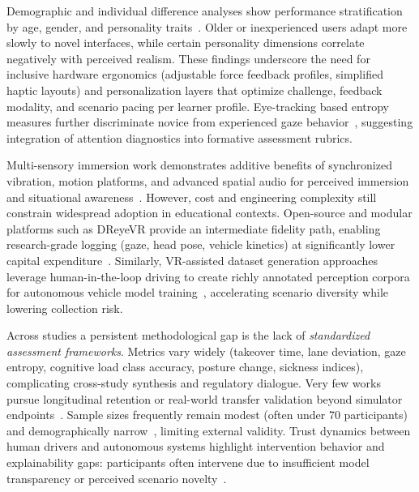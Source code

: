 Demographic and individual difference analyses show performance stratification by age, gender, and personality traits~\cite{Chang2020,Ju2024}. Older or inexperienced users adapt more slowly to novel interfaces, while certain personality dimensions correlate negatively with perceived realism. These findings underscore the need for inclusive hardware ergonomics (adjustable force feedback profiles, simplified haptic layouts) and personalization layers that optimize challenge, feedback modality, and scenario pacing per learner profile. Eye-tracking based entropy measures further discriminate novice from experienced gaze behavior~\cite{Chung2022}, suggesting integration of attention diagnostics into formative assessment rubrics.

Multi-sensory immersion work demonstrates additive benefits of synchronized vibration, motion platforms, and advanced spatial audio for perceived immersion and situational awareness~\cite{GilCarvajal2024,Hartfiel2019}. However, cost and engineering complexity still constrain widespread adoption in educational contexts. Open-source and modular platforms such as DReyeVR provide an intermediate fidelity path, enabling research-grade logging (gaze, head pose, vehicle kinetics) at significantly lower capital expenditure~\cite{Silvera2022}. Similarly, VR-assisted dataset generation approaches leverage human-in-the-loop driving to create richly annotated perception corpora for autonomous vehicle model training~\cite{Yao2020}, accelerating scenario diversity while lowering collection risk.

Across studies a persistent methodological gap is the lack of \emph{standardized assessment frameworks}. Metrics vary widely (takeover time, lane deviation, gaze entropy, cognitive load class accuracy, posture change, sickness indices), complicating cross-study synthesis and regulatory dialogue. Very few works pursue longitudinal retention or real-world transfer validation beyond simulator endpoints~\cite{He2022}. Sample sizes frequently remain modest (often under 70 participants) and demographically narrow~\cite{Muguro2023,Qadir2019,Schultheis2005}, limiting external validity. Trust dynamics between human drivers and autonomous systems highlight intervention behavior and explainability gaps: participants often intervene due to insufficient model transparency or perceived scenario novelty~\cite{Xu2022}.

